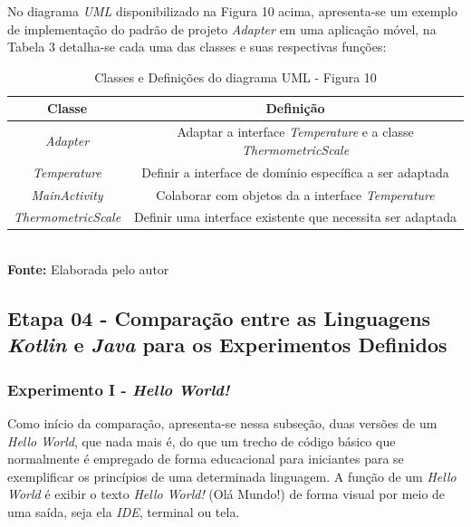 No diagrama \textit{UML} disponibilizado na Figura 10 acima, apresenta-se um exemplo de implementação do padrão de projeto \textit{Adapter} em uma aplicação móvel, na Tabela 3 detalha-se cada uma das classes e suas respectivas funções:

\FloatBarrier
\begin{table}[!htbp]
\centering
\caption{Classes e Definições do diagrama UML - Figura 10}
	\begin{tabular}{ c | c }
		\hline
		\textbf{Classe} & \textbf{Definição}\\ \hline
		
         \textit{Adapter} & Adaptar a interface \textit{Temperature} e a classe \textit{ThermometricScale}
         \\ \hline
         
          \textit{Temperature}   & Definir a interface de domínio específica a ser adaptada
          \\ \hline
         
     	 \textit{MainActivity}  & Colaborar com objetos da a interface \textit{Temperature}
     	 \\ \hline
     	 
     	   \textit{ThermometricScale}  & Definir uma interface existente que necessita ser adaptada
     	   \\ \hline
	\end{tabular}
	\\ \vspace{0.2cm}
	\textbf{Fonte:} Elaborada pelo autor
	\label{tab:exemplo}
\end{table}
\FloatBarrier

\subsection{Etapa 04 - Comparação entre as Linguagens \textit{Kotlin} e \textit{Java} para os Experimentos Definidos}

\subsubsection{Experimento I - \textit{Hello World!}}

Como início da comparação, apresenta-se nessa subseção, duas versões de um \textit{Hello World}, que nada mais é, do que um trecho de código básico que normalmente é empregado de forma educacional para iniciantes para se exemplificar os princípios de uma determinada linguagem. A função de um \textit{Hello World} é exibir o texto \textit{Hello World!} (Olá Mundo!) de forma visual por meio de uma saída, seja ela \textit{IDE}, terminal ou tela.

